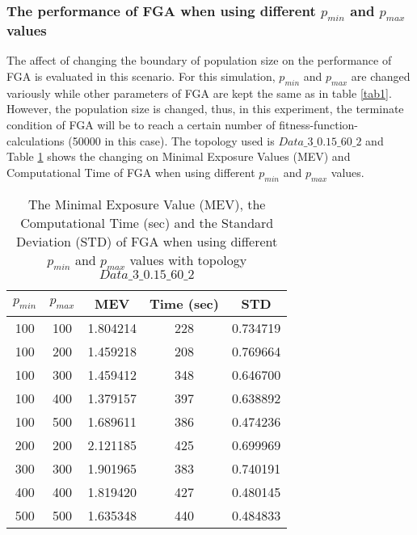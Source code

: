\documentclass[final]{elsarticle}
\begin{document}
\subsubsection{The performance of FGA when using different $ p_{min} $ and $ p_{max} $ values}
The affect of changing the boundary of population size on the performance of FGA is evaluated in this scenario. For this simulation, $ p_{min} $ and $ p_{max} $ are changed variously while other parameters of FGA are kept the same as in table \ref{tab1}. However, the population size is changed, thus, in this experiment, the terminate condition of FGA will be to reach a certain number of fitness-function-calculations (50000 in this case). The topology used is $ Data\_3\_0.15\_60\_2 $ and Table \ref{tab2} shows the changing on Minimal Exposure Values (MEV) and Computational Time of FGA when using different $ p_{min} $ and $ p_{max} $ values.
\begin{table}
	\caption{The Minimal Exposure Value (MEV), the Computational Time (sec) and the Standard Deviation (STD) of FGA when using different $ p_{min} $ and $ p_{max} $ values with topology $ Data\_3\_0.15\_60\_2 $  }
	\label{tab2}       %
	\begin{center}
		\renewcommand{\arraystretch}{1.5}
		\begin{tabular}{|c|c|c|c|c|}
			\hline
			$ p_{min} $ & $ p_{max} $  & \textbf{MEV} & \textbf{Time (sec)} & \textbf{STD} \\
			\hline
			100 & 100 &1.804214 &228 &0.734719\\
			\hline
			100 & 200 &1.459218 &208 &0.769664\\
			\hline
			100 & 300 &1.459412 &348 &0.646700\\
			\hline
			100 & 400 &1.379157 &397 &0.638892\\
			\hline
			100 & 500 &1.689611 &386 &0.474236\\
			\hline\hline
			200 & 200 &2.121185 &425 &0.699969\\\hline
			300 & 300 &1.901965 &383 &0.740191\\\hline
			400 & 400 &1.819420 &427 &0.480145\\\hline
			500 & 500 &1.635348 &440 &0.484833\\\hline
		\end{tabular}
	\end{center}
\end{table}
\end{document}
